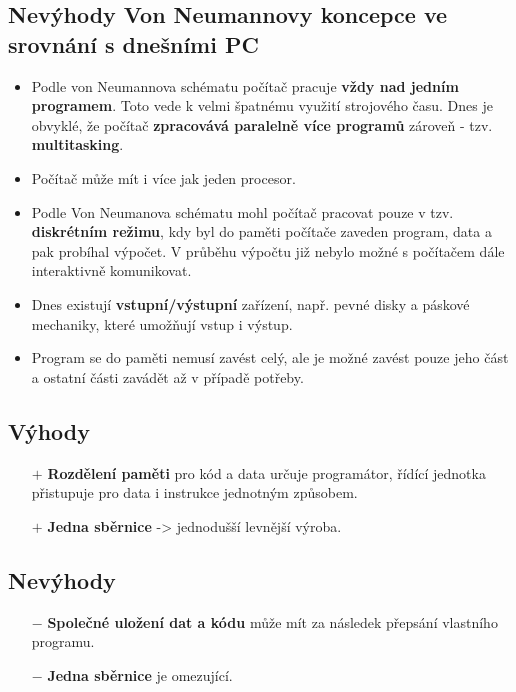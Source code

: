 \subsection{Nevýhody Von Neumannovy koncepce ve srovnání s dnešními PC}
\begin{itemize}
    \item Podle von Neumannova schématu počítač pracuje \textbf{vždy nad jedním programem}. Toto vede k velmi špatnému využití strojového času. Dnes je obvyklé, že počítač \textbf{zpracovává paralelně více programů} zároveň - tzv. \textbf{multitasking}.
    \item Počítač může mít i více jak jeden procesor.
    \item Podle Von Neumanova schématu mohl počítač pracovat pouze v tzv. \textbf{diskrétním režimu}, kdy byl do paměti počítače zaveden program, data a pak probíhal výpočet. V průběhu výpočtu již nebylo možné s počítačem dále interaktivně komunikovat.
    \item Dnes existují \textbf{vstupní/výstupní} zařízení, např. pevné disky a páskové mechaniky, které umožňují vstup i výstup.
    \item Program se do paměti nemusí zavést celý, ale je možné zavést pouze jeho část a ostatní části zavádět až v případě potřeby.
\end{itemize}

\noindent{}

\subsection*{Výhody}
\begin{itemize}
    \item[$+$] \textbf{Rozdělení paměti} pro kód a data určuje programátor, řídící jednotka přistupuje pro  data i instrukce jednotným způsobem.
    \item[$+$] \textbf{Jedna sběrnice} ->  jednodušší levnější výroba.
\end{itemize}
\subsection*{Nevýhody}
\begin{itemize}
    \item[$-$] \textbf{Společné uložení dat a kódu} může mít za následek přepsání vlastního programu.

    \item[$-$] \textbf{Jedna sběrnice} je omezující.
\end{itemize}

